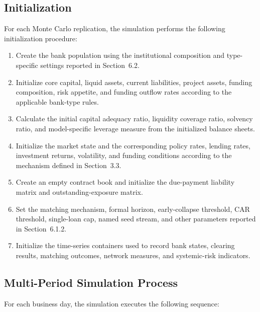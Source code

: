\subsection{Initialization}

For each Monte Carlo replication, the simulation performs the following
initialization procedure:

\begin{enumerate}
\def\labelenumi{\arabic{enumi}.}
\item
  Create the bank population using the institutional composition and
  type-specific settings reported in Section~6.2.
\item
  Initialize core capital, liquid assets, current liabilities, project
  assets, funding composition, risk appetite, and funding outflow rates
  according to the applicable bank-type rules.
\item
  Calculate the initial capital adequacy ratio, liquidity coverage
  ratio, solvency ratio, and model-specific leverage measure from the
  initialized balance sheets.
\item
  Initialize the market state and the corresponding policy rates,
  lending rates, investment returns, volatility, and funding conditions
  according to the mechanism defined in Section~3.3.
\item
  Create an empty contract book and initialize the due-payment liability
  matrix and outstanding-exposure matrix.
\item
  Set the matching mechanism, formal horizon, early-collapse threshold,
  CAR threshold, single-loan cap, named seed stream, and other
  parameters reported in Section~6.1.2.
\item
  Initialize the time-series containers used to record bank states,
  clearing results, matching outcomes, network measures, and
  systemic-risk indicators.
\end{enumerate}

\subsection{Multi-Period Simulation Process}

For each business day, the simulation executes the following sequence:

